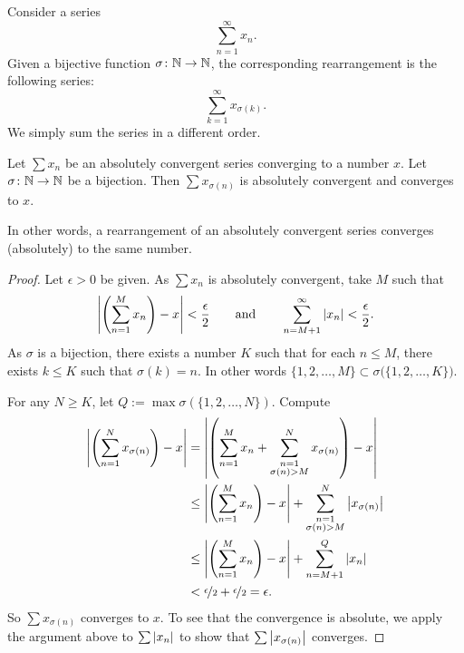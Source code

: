Consider a series
\begin{equation*}
\sum_{n=1}^\infty x_n .
\end{equation*}
Given a bijective function $\sigma \colon {\mathbb{N}} \to {\mathbb{N}}$, the corresponding
rearrangement is the following
series:
\begin{equation*}
\sum_{k=1}^\infty x_{\sigma(k)} .
\end{equation*}
We simply sum the series in a different order.

\begin{prop}
Let $\sum x_n$ be an absolutely convergent series converging to a number
$x$.  Let $\sigma \colon {\mathbb{N}} \to {\mathbb{N}}$ be a bijection.  Then
$\sum x_{\sigma(n)}$ is absolutely convergent and converges to $x$.
\end{prop}

In other words,
a rearrangement of an absolutely convergent series converges (absolutely)
to the same number.

\begin{proof}
Let $\epsilon > 0$ be given.  As $\sum x_n$ is absolutely convergent, take $M$ such that
\begin{equation*}
\left\lvert {\left(\sum_{n=1}^M x_n \right) - x} \right\rvert < \frac{\epsilon}{2}
\qquad \text{and} \qquad
\sum_{n=M+1}^\infty \left\lvert {x_n} \right\rvert < \frac{\epsilon}{2} .
\end{equation*}
As $\sigma$ is a bijection,
there exists a number $K$ such that for each
$n \leq M$, there exists $k \leq K$ such that $\sigma(k) = n$.
In other words
$\{ 1,2,\ldots,M \} \subset \sigma\bigl(\{ 1,2,\ldots,K \} \bigr)$.

For any $N \geq K$, let $Q := \max \sigma(\{ 1,2,\ldots,N \})$.
Compute
\begin{equation*}
\begin{split}
\left\lvert {\left( \sum_{n=1}^N x_{\sigma(n)} \right) - x} \right\rvert
& =
\left\lvert { \left( \sum_{n=1}^M x_n
+
\sum_{\substack{n=1\\\sigma(n) > M}}^N x_{\sigma(n)} \right) - x} \right\rvert
\\
& \leq
\left\lvert { \left( \sum_{n=1}^M x_n \right) - x} \right\rvert
+
\sum_{\substack{n=1\\\sigma(n) > M}}^N \left\lvert {x_{\sigma(n)}} \right\rvert
\\
& \leq
\left\lvert { \left( \sum_{n=1}^M x_n \right) - x} \right\rvert
+
\sum_{n=M+1}^Q \left\lvert {x_{n}} \right\rvert
\\
& < \nicefrac{\epsilon}{2} + \nicefrac{\epsilon}{2} = \epsilon .
\end{split}
\end{equation*}
So 
$\sum x_{\sigma(n)}$ converges to $x$.  To see that the convergence
is absolute, we apply the argument above to $\sum \left\lvert {x_n} \right\rvert$ to show
that $\sum \left\lvert {x_{\sigma(n)}} \right\rvert$ converges.
\end{proof}


